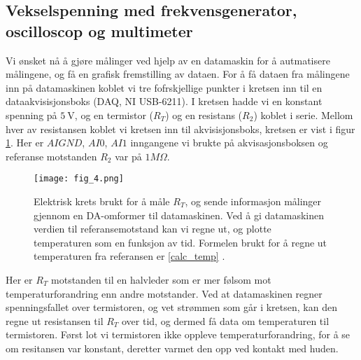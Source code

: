 \documentclass[%
 reprint,
 amsmath,amssymb,
 aps,
]{revtex4-1}
\begin{document}
\subsection{Vekselspenning med frekvensgenerator, oscilloscop og multimeter}
Vi ønsket nå å gjøre målinger ved hjelp av en datamaskin for å autmatisere målingene, og få en grafisk fremstilling av dataen. For å få dataen fra målingene inn på datamaskinen koblet vi tre fofrskjellige punkter i kretsen inn til en dataakvisisjonsboks (DAQ, NI USB-6211). I kretsen hadde vi en konstant spenning på $\SI{5}{\volt}$, og en termistor ($R_T$) og en resistans ($R_2$) koblet i serie. Mellom hver av resistansen koblet vi kretsen inn til akvisisjonsboks, kretsen er vist i figur \ref{fig4}. Her er $AIGND$, $AI0$, $AI1$ inngangene vi brukte på akvisasjonsboksen og referanse motstanden $R_2$ var på $1M\Omega$.
\begin{figure}[h!]
    \centering
    \texttt{[image: fig\_4.png]}
    \caption{Elektrisk krets brukt for å måle $R_T$, og sende informasjon målinger gjennom en DA-omformer til datamaskinen. Ved å gi datamaskinen verdien til referansemotstand kan vi regne ut, og plotte temperaturen som en funksjon av tid. Formelen brukt for å regne ut temperaturen fra referansen er \eqref{calc_temp} \cite{oppgave}.}
    \label{fig4}
\end{figure}
Her er $R_T$ motstanden til en halvleder som er mer følsom mot temperaturforandring enn andre motstander. Ved at datamaskinen regner spenningsfallet over termistoren, og vet strømmen som går i kretsen, kan den regne ut resistansen til $R_T$ over tid, og dermed få data om temperaturen til termistoren. Først lot vi termistoren ikke oppleve temperaturforandring, for å se om resitansen var konstant, deretter varmet den opp ved kontakt med huden.
\end{document}
